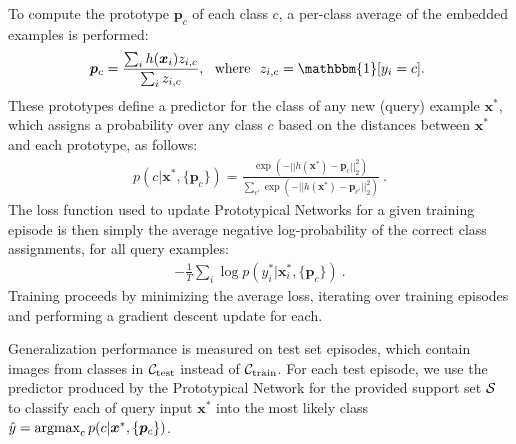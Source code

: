 To compute the prototype $\bm{p}_c$ of each class $c$, a per-class average of the embedded examples is performed: 
\begin{align}
    \bm{p}_c = \frac{\sum_i h(\bm{x}_i) z_{i,c}}{\sum_i z_{i,c}},~~{\rm where }~~z_{i,c} = \mathbbm{1}[y_i = c].~\label{eq:prototypes}
\end{align}
These prototypes define a predictor for the class of any new (query) example $\bm{x}^*$, which assigns a probability over any class $c$ based on the distances between $\bm{x}^*$ and each prototype, as follows:
\begin{align}
    p(c|\bm{x}^*,\{\bm{p}_c\}) = \frac{\exp(-||h(\bm{x}^*) - \bm{p}_c||^2_2)}{\sum_{c'}\exp(-||h(\bm{x}^*) - \bm{p}_{c'}||^2_2)}~.\label{eq:classprobs}
\end{align}
The loss function used to update Prototypical Networks for a given training episode is then simply the average negative log-probability of the correct class assignments, for all query examples:
\begin{align}
    -\frac{1}{T}\sum_{i} \log p(y^*_i|\bm{x}_i^*,\{\bm{p}_c\})~.\label{eq:loss}
\end{align}
Training proceeds by minimizing the average loss, iterating over training episodes and performing a gradient descent update for each. 

Generalization performance is measured on test set episodes, which contain images from classes in ${\cal C}_{\rm test}$ instead of ${\cal C}_{\rm train}$. For each test episode, we use the predictor produced by the Prototypical Network for the provided support set ${\cal S}$ to classify each of query input $\bm{x}^*$ into the most likely class $\hat{y} = \operatorname*{argmax}_c p(c|\bm{x}^*,\{\bm{p}_c\})$.